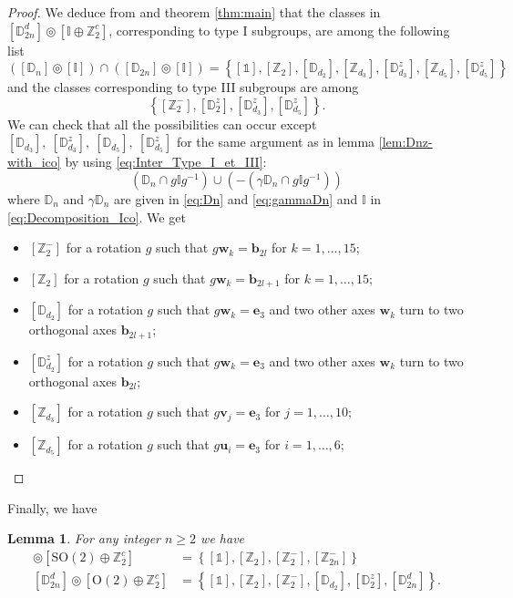 \documentclass[11pt,a4paper]{amsart}
\newtheorem{lem}[thm]{Lemma}
\theoremstyle{definition}
\newcommand{\ZZ}{\mathbb{Z}}                %
\newcommand{\OO}{\mathrm{O}}                %
\newcommand{\SO}{\mathrm{SO}}               %
\newcommand{\ico}{\mathbb{I}}               %
\newcommand{\DD}{\mathbb{D}}                %
\newcommand{\1}{\mathds{1}}		            %
\newcommand{\ee}{\pmb{e}}                   %
\newcommand{\uu}{\pmb{u}}                   %
\newcommand{\vv}{\pmb{v}}                   %
\newcommand{\bb}{\mathbf{b}}
\newcommand{\set}[1]{\left\{#1\right\}}     %
\newcommand{\Dnd}{\DD_{2n}^d}
\begin{document}
\begin{proof}
  	We deduce from \cite[table 1]{Olive2019} and theorem \ref{thm:main} that the classes in $[\DD_{2n}^d]\circledcirc [\ico\oplus \ZZ_2^c]$, corresponding to type I subgroups, are among the following list
  \begin{equation*}
  ([\DD_n]\circledcirc [\ico])\cap ([\DD_{2n}]\circledcirc[\ico])=\set{[\1],[\ZZ_{2}],[\DD_{d_2}],[\ZZ_{d_3}],[\DD_{d_3}^z],[\ZZ_{d_5}],[\DD_{d_5}^z]}
  \end{equation*}
  and the classes corresponding to type III subgroups are among
  \begin{equation*}
  \set{[\ZZ_2^-],[\DD_{2}^z] ,[\DD_{d_3}^z],[\DD_{d_5}^z]}.
  \end{equation*}
  We can check that all the possibilities can occur except $[\DD_{d_3}], \ [\DD_{d_3}^z],\ [\DD_{d_5}],\ [\DD_{d_5}^z]$ for the same argument as in lemma \ref{lem:Dnz-with_ico} by using \eqref{eq:Inter_Type_I_et_III}:
  \begin{equation*}
  (\DD_n\cap g \ico g^{-1})\cup (-(\gamma\DD_n\cap g \ico g^{-1}))
  \end{equation*}
   where  $\DD_n$ and $ \gamma\DD_n$ are given in \eqref{eq:Dn} and \eqref{eq:gammaDn} and $\ico$ in \eqref{eq:Decomposition_Ico}.
  We get
  \begin{itemize}
  	
  	\item $[\ZZ_2^-]$ for a rotation $g$ such that $g\pmb{w}_{k}=\bb_{2l}$ for $k=1,\dotsc, 15$;
  	\item $[\ZZ_{2}]$ for a rotation $g$ such that $g\pmb{w}_{k}= \bb_{2l+1}$ for $k=1,\dotsc, 15$;
  	\item $[\DD_{d_2}]$ for a rotation $g$ such that $g\pmb{w}_{k}= \ee_3$ and two other axes $\pmb{w}_{k}$ turn to two orthogonal axes $\bb_{2l+1}$;
  	\item $[\DD_{d_2}^z]$ for a rotation $g$ such that $g\pmb{w}_{k}= \ee_3$ and two other axes $\pmb{w}_{k}$ turn to two orthogonal axes $ \bb_{2l}$;
  	\item $[\ZZ_{d_3}]$ for a rotation $g$ such that $g\vv_{j}= \ee_3$ for $j=1,\dotsc,10$;
  	\item $[\ZZ_{d_5}]$ for a rotation $g$ such that $g\uu_i= \ee_3$ for $i=1,\dotsc,6$;
 
  \end{itemize}
\end{proof}
  

Finally, we have

\begin{lem}
  For any integer $n\geq 2$ we have
  \begin{align*}
    [\DD_{2n}^{d}] \circledcirc [\SO(2) \oplus \ZZ_2^c] & =\set{[\1],[\ZZ_2],[\ZZ_2^-],[\ZZ_{2n}^-]}               \\
    [\DD_{2n}^{d}] \circledcirc [\OO(2) \oplus \ZZ_2^c] & =\set{[\1],[\ZZ_2],[\ZZ_2^-],[\DD_{d_2}],[\DD_2^z],[\Dnd]}.
  \end{align*}
\end{lem}
\end{document}
